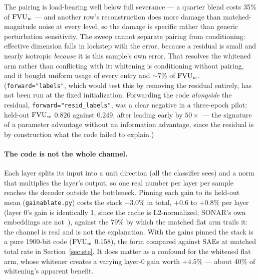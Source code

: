The pairing is load-bearing well below full severance --- a quarter blend
costs 35\% of $\mathrm{FVU}_w$ --- and another row's reconstruction does more damage
than matched-magnitude noise at every level, so the damage is specific
rather than generic perturbation sensitivity. The sweep cannot separate
pairing from conditioning: effective dimension falls in lockstep with the
error, because a residual is small and nearly isotropic \emph{because} it
is this sample's own error. That resolves the whitened arm rather than
conflicting with it: whitening is conditioning without pairing, and it
bought uniform usage of every entry and $\sim$7\% of $\mathrm{FVU}_w$. (\texttt{forward="labels"},
which would test this by removing the residual entirely, has not been run
at the fixed initialization. Forwarding the code \emph{alongside} the
residual, \texttt{forward="resid\_labels"}, was a clear negative in a
three-epoch pilot: held-out $\mathrm{FVU}_w$ $0.826$ against $0.249$, after leading
early by $50\times$ --- the signature of a parameter advantage without an
information advantage, since the residual is by construction what the
code failed to explain.)

\paragraph{The code is not the whole channel.} Each layer splits its input
into a unit direction (all the classifier sees) and a norm that multiplies
the layer's output, so one real number per layer per sample reaches the
decoder outside the bottleneck. Pinning each gain to its held-out mean
(\texttt{gainablate.py}) costs the stack $+3.0\%$ in total, $+0.6$ to
$+0.8\%$ per layer (layer 0's gain is identically 1, since the cache is
L2-normalized; SONAR's own embeddings are not~\cite{sonar}), against the
79\% by which the matched flat arm trails it: the channel is real and is
not the explanation. With the gains pinned the stack is a pure 1900-bit
code ($\mathrm{FVU}_w$ $0.158$), the form compared against SAEs at matched total
rate in Section~\ref{sec:ste}. It does matter as a confound
for the whitened flat arm, whose whitener creates a varying layer-0 gain
worth $+4.5\%$ --- about 40\% of whitening's apparent benefit.

